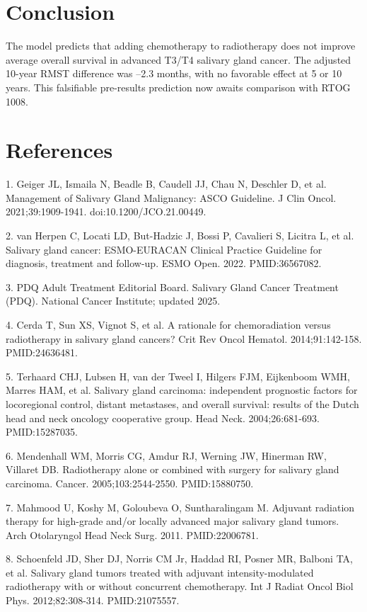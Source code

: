 \documentclass[10pt,twocolumn]{article}
\begin{document}
\section{Conclusion}
The model predicts that adding chemotherapy to radiotherapy does not improve average overall survival in advanced T3/T4 salivary gland cancer. The adjusted 10-year RMST difference was --2.3 months, with no favorable effect at 5 or 10 years. This falsifiable pre-results prediction now awaits comparison with RTOG 1008.\par
\section{References}
1. Geiger JL, Ismaila N, Beadle B, Caudell JJ, Chau N, Deschler D, et al. Management of Salivary Gland Malignancy: ASCO Guideline. J Clin Oncol. 2021;39:1909-1941. doi:10.1200/JCO.21.00449.\par
2. van Herpen C, Locati LD, But-Hadzic J, Bossi P, Cavalieri S, Licitra L, et al. Salivary gland cancer: ESMO-EURACAN Clinical Practice Guideline for diagnosis, treatment and follow-up. ESMO Open. 2022. PMID:36567082.\par
3. PDQ Adult Treatment Editorial Board. Salivary Gland Cancer Treatment (PDQ). National Cancer Institute; updated 2025.\par
4. Cerda T, Sun XS, Vignot S, et al. A rationale for chemoradiation versus radiotherapy in salivary gland cancers? Crit Rev Oncol Hematol. 2014;91:142-158. PMID:24636481.\par
5. Terhaard CHJ, Lubsen H, van der Tweel I, Hilgers FJM, Eijkenboom WMH, Marres HAM, et al. Salivary gland carcinoma: independent prognostic factors for locoregional control, distant metastases, and overall survival: results of the Dutch head and neck oncology cooperative group. Head Neck. 2004;26:681-693. PMID:15287035.\par
6. Mendenhall WM, Morris CG, Amdur RJ, Werning JW, Hinerman RW, Villaret DB. Radiotherapy alone or combined with surgery for salivary gland carcinoma. Cancer. 2005;103:2544-2550. PMID:15880750.\par
7. Mahmood U, Koshy M, Goloubeva O, Suntharalingam M. Adjuvant radiation therapy for high-grade and/or locally advanced major salivary gland tumors. Arch Otolaryngol Head Neck Surg. 2011. PMID:22006781.\par
8. Schoenfeld JD, Sher DJ, Norris CM Jr, Haddad RI, Posner MR, Balboni TA, et al. Salivary gland tumors treated with adjuvant intensity-modulated radiotherapy with or without concurrent chemotherapy. Int J Radiat Oncol Biol Phys. 2012;82:308-314. PMID:21075557.\par
\end{document}
